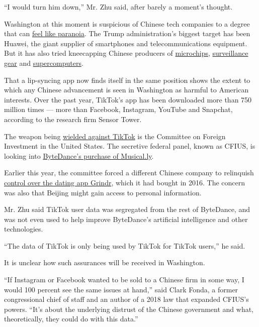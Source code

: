 ``I would turn him down,'' Mr. Zhu said, after barely a moment's
thought.

Washington at this moment is suspicious of Chinese tech companies to a
degree that can
\href{https://www.nytimes3xbfgragh.onion/2019/07/20/us/politics/china-red-scare-washington.html}{feel
like paranoia}. The Trump administration's biggest target has been
Huawei, the giant supplier of smartphones and telecommunications
equipment. But it has also tried kneecapping Chinese producers of
\href{https://www.nytimes3xbfgragh.onion/2018/10/29/us/politics/fujian-jinhua-china-sales.html}{microchips},
\href{https://www.nytimes3xbfgragh.onion/2019/10/07/us/politics/us-to-blacklist-28-chinese-entities-over-abuses-in-xinjiang.html}{surveillance
gear} and
\href{https://www.nytimes3xbfgragh.onion/2019/06/21/us/politics/us-china-trade-blacklist.html}{supercomputers}.

That a lip-syncing app now finds itself in the same position shows the
extent to which any Chinese advancement is seen in Washington as harmful
to American interests. Over the past year, TikTok's app has been
downloaded more than 750 million times --- more than Facebook,
Instagram, YouTube and Snapchat, according to the research firm Sensor
Tower.

The weapon being
\href{https://www.nytimes3xbfgragh.onion/2019/11/01/technology/tiktok-national-security-review.html}{wielded
against TikTok} is the Committee on Foreign Investment in the United
States. The secretive federal panel, known as CFIUS, is looking into
\href{https://www.nytimes3xbfgragh.onion/2017/11/10/business/dealbook/musically-sold-app-video.html}{ByteDance's
purchase of Musical.ly}.

Earlier this year, the committee forced a different Chinese company to
relinquish
\href{https://www.nytimes3xbfgragh.onion/2019/03/28/us/politics/grindr-china-national-security.html}{control
over the dating app Grindr}, which it had bought in 2016. The concern
was also that Beijing might gain access to personal information.

Mr. Zhu said TikTok user data was segregated from the rest of ByteDance,
and was not even used to help improve ByteDance's artificial
intelligence and other technologies.

``The data of TikTok is only being used by TikTok for TikTok users,'' he
said.

It is unclear how such assurances will be received in Washington.

``If Instagram or Facebook wanted to be sold to a Chinese firm in some
way, I would 100 percent see the same issues at hand,'' said Clark
Fonda, a former congressional chief of staff and an author of a 2018 law
that expanded CFIUS's powers. ``It's about the underlying distrust of
the Chinese government and what, theoretically, they could do with this
data.''

